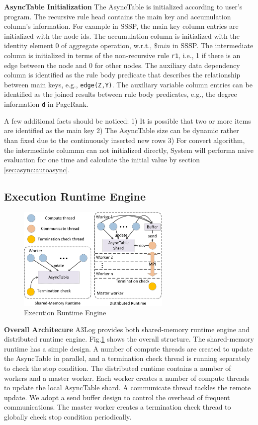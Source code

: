 \noindent\textbf{AsyncTable Initialization}
The AsyncTable is initialized according to user's program. The recursive rule head contains the main key and accumulation column's information. For example in SSSP, the main key column entries are initialized with the node ids. The accumulation column is initialized with the identity element \textbf{$0$} of aggregate operation, w.r.t., $\$min$ in SSSP. The intermediate column is initialized in terms of the non-recursive rule  \texttt{r1}, i.e., 1 if there is an edge between the node and 0 for other nodes. The auxiliary data dependency column is identified as the rule body predicate that describes the relationship between main keys, e.g., \texttt{edge(Z,Y)}. The auxiliary variable column entries can be identified as the joined results between rule body predicates, e.g., the degree information \texttt{d} in PageRank.

A few additional facts should be noticed: 1) It is possible that two or more items are identified as the main key  2) The AsyncTable size can be dynamic rather than fixed due to the continuously inserted new rows 3) For convert algorithm, the intermediate colummn can not initialized directly, System will performa naive evaluation for one time and calculate the initial value by section \ref{sec:async:autoasync}. 

\subsection{Execution Runtime Engine}
\label{sec:system:runtime}

\begin{figure}[!t]
	\centering
	\includegraphics[width=2.9in]{fig/runtime}
	\vspace{-0.0in}
	\caption{Execution Runtime Engine}
	\label{fig:runtime}
	\vspace{-0.1in}
\end{figure}

\noindent\textbf{Overall Architecure}
A3Log provides both shared-memory runtime engine and distributed runtime engine. Fig.\ref{fig:runtime} shows the overall structure. The shared-memory runtime has a simple design. A number of compute threads are created to update the AsyncTable in parallel, and a termination check thread is running separately to check the stop condition. The distributed runtime contains a number of workers and a master worker. Each worker creates a number of compute threads to update the local AsyncTable shard. A communicate thread tackles the remote update. We adopt a send buffer design to control the overhead of frequent communications. The master worker creates a termination check thread to globally check stop condition periodically.



